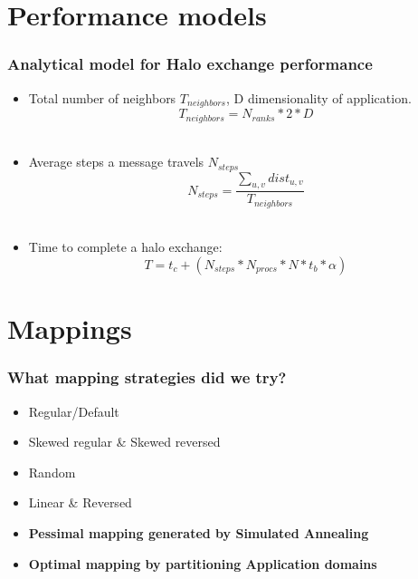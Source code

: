 \documentclass{beamer}
\begin{document}
\section{Performance models}
\begin{frame}
\frametitle{Analytical model for Halo exchange performance}
\begin{itemize}
\item Total number of neighbors $T_{neighbors}$, D dimensionality of application.
\begin{equation}
  T_{neighbors} = N_{ranks} * 2 * D
\end{equation} \\
\item Average steps a message travels $N_{steps}$
\begin{equation}
  N_{steps} = \frac{ \sum\limits_{u,v} dist_{u,v} } {T_{neighbors}}
\end{equation} \\
\item Time to complete a halo exchange:
\begin{equation}
  T = t_c + (N_{steps} * N_{procs} * N * t_b * \alpha)
\end{equation}
\end{itemize}
\end{frame}

\section{Mappings}
\begin{frame}
\frametitle{What mapping strategies did we try?}
\begin{itemize}
\item Regular/Default
\item Skewed regular \& Skewed reversed
\item Random
\item Linear \& Reversed
\item \textbf{Pessimal mapping generated by Simulated Annealing}
\item \textbf{Optimal mapping by partitioning Application domains}
\end{itemize}
\end{frame}
\end{document}
